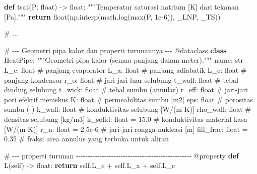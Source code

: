 \documentclass[
  indonesian,
  12pt,
  a4paper,
]{report}
\newenvironment{Shaded}{\begin{snugshade}}{\end{snugshade}}
\newcommand{\AttributeTok}[1]{\textcolor[rgb]{0.40,0.45,0.13}{#1}}
\newcommand{\BuiltInTok}[1]{\textcolor[rgb]{0.00,0.23,0.31}{#1}}
\newcommand{\CommentTok}[1]{\textcolor[rgb]{0.37,0.37,0.37}{#1}}
\newcommand{\ControlFlowTok}[1]{\textcolor[rgb]{0.00,0.23,0.31}{\textbf{#1}}}
\newcommand{\FloatTok}[1]{\textcolor[rgb]{0.68,0.00,0.00}{#1}}
\newcommand{\KeywordTok}[1]{\textcolor[rgb]{0.00,0.23,0.31}{\textbf{#1}}}
\newcommand{\NormalTok}[1]{\textcolor[rgb]{0.00,0.23,0.31}{#1}}
\newcommand{\OperatorTok}[1]{\textcolor[rgb]{0.37,0.37,0.37}{#1}}
\newcommand{\VariableTok}[1]{\textcolor[rgb]{0.07,0.07,0.07}{#1}}
\begin{document}
\begin{Shaded}
\begin{Highlighting}[]
\KeywordTok{def}\NormalTok{ tsat(P: }\BuiltInTok{float}\NormalTok{) }\OperatorTok{{-}\textgreater{}} \BuiltInTok{float}\NormalTok{:}
    \CommentTok{"""Temperatur saturasi natrium [K] dari tekanan [Pa]."""}
    \ControlFlowTok{return} \BuiltInTok{float}\NormalTok{(np.interp(math.log(}\BuiltInTok{max}\NormalTok{(P, }\FloatTok{1e{-}6}\NormalTok{)), \_LNP, \_TS))}

\CommentTok{\# ...}

\CommentTok{\# {-}{-}{-} Geometri pipa kalor dan properti turunannya {-}{-}{-}}
\AttributeTok{@dataclass}
\KeywordTok{class}\NormalTok{ HeatPipe:}
    \CommentTok{"""Geometri pipa kalor (semua panjang dalam meter)."""}
\NormalTok{    name: }\BuiltInTok{str}
\NormalTok{    L\_e: }\BuiltInTok{float}          \CommentTok{\# panjang evaporator}
\NormalTok{    L\_a: }\BuiltInTok{float}          \CommentTok{\# panjang adiabatik}
\NormalTok{    L\_c: }\BuiltInTok{float}          \CommentTok{\# panjang kondensor}
\NormalTok{    r\_o: }\BuiltInTok{float}          \CommentTok{\# jari{-}jari luar selubung}
\NormalTok{    t\_wall: }\BuiltInTok{float}       \CommentTok{\# tebal dinding selubung}
\NormalTok{    t\_wick: }\BuiltInTok{float}       \CommentTok{\# tebal sumbu (annular)}
\NormalTok{    r\_eff: }\BuiltInTok{float}        \CommentTok{\# jari{-}jari pori efektif meniskus}
\NormalTok{    K: }\BuiltInTok{float}            \CommentTok{\# permeabilitas sumbu [m2]}
\NormalTok{    eps: }\BuiltInTok{float}          \CommentTok{\# porositas sumbu ({-})}
\NormalTok{    k\_wall: }\BuiltInTok{float}       \CommentTok{\# konduktivitas selubung [W/(m K)]}
\NormalTok{    rho\_wall: }\BuiltInTok{float}     \CommentTok{\# densitas selubung [kg/m3]}
\NormalTok{    k\_solid: }\BuiltInTok{float} \OperatorTok{=} \FloatTok{15.0}   \CommentTok{\# konduktivitas material kasa [W/(m K)]}
\NormalTok{    r\_n: }\BuiltInTok{float} \OperatorTok{=} \FloatTok{2.5e{-}6}     \CommentTok{\# jari{-}jari rongga nukleasi [m]}
\NormalTok{    fill\_frac: }\BuiltInTok{float} \OperatorTok{=} \FloatTok{0.35}  \CommentTok{\# fraksi area annulus yang terbuka untuk aliran}

    \CommentTok{\# {-}{-}{-} properti turunan {-}{-}{-}{-}{-}{-}{-}{-}{-}{-}{-}{-}{-}{-}{-}{-}{-}{-}{-}{-}{-}{-}{-}{-}{-}{-}{-}{-}{-}{-}{-}{-}{-}{-}{-}{-}{-}{-}{-}{-}{-}{-}{-}{-}{-}{-}{-}{-}{-}}
    \AttributeTok{@property}
    \KeywordTok{def}\NormalTok{ L(}\VariableTok{self}\NormalTok{) }\OperatorTok{{-}\textgreater{}} \BuiltInTok{float}\NormalTok{:}
        \ControlFlowTok{return} \VariableTok{self}\NormalTok{.L\_e }\OperatorTok{+} \VariableTok{self}\NormalTok{.L\_a }\OperatorTok{+} \VariableTok{self}\NormalTok{.L\_c}


\end{Highlighting}
\end{Shaded}
\end{document}
